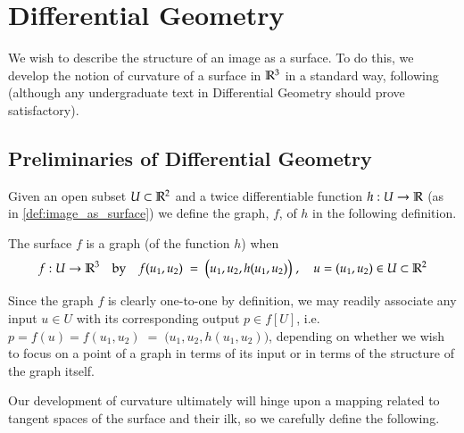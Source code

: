 \section{Differential Geometry} \label{sec:differential-geometry}
  
We wish to describe the structure of an image as a surface. To do this, we develop the notion of curvature of a surface in $\mathbb{R}^3$ in a standard way, following \cite{Kuhnel-DiffGeo} (although any undergraduate text in Differential Geometry should prove satisfactory).

\subsection{Preliminaries of Differential Geometry}
    Given an open subset $U\subset \mathbb{R}^2$ and a twice differentiable function  $h: U \to \mathbb{R}$ (as in \cref{def:image_as_surface})
    we define the graph, $f$, of $h$ in the following definition.
    
    \begin{defn} \label{def:graph}
    The surface $f$ is a graph (of the function $h$) when 
    \[
     f: U \to \mathbb{R}^3 \quad \textrm{by} \quad f(u_1, u_2) \;=\; \big(u_1 , u_2 , h(u_1,u_2)\big)
     \;,\quad u = (u_1, u_2) \in U \subset \mathbb{R}^2 \]
    \end{defn}
    Since the graph $f$ is clearly one-to-one by definition, we may readily associate any input $u\in U$ with
    its corresponding output $p \in f[U]$, i.e.
    $ p = f(u) = f(u_1, u_2) \;=\; \big(u_1 , u_2 , h(u_1,u_2)\big)$,
    depending on whether we wish to focus on a point of a graph in terms of its input
    or in terms of the structure of the graph itself.
    
    Our development of curvature ultimately will hinge upon a mapping
    related to tangent spaces of the surface and their ilk, so we carefully define the following.
    
